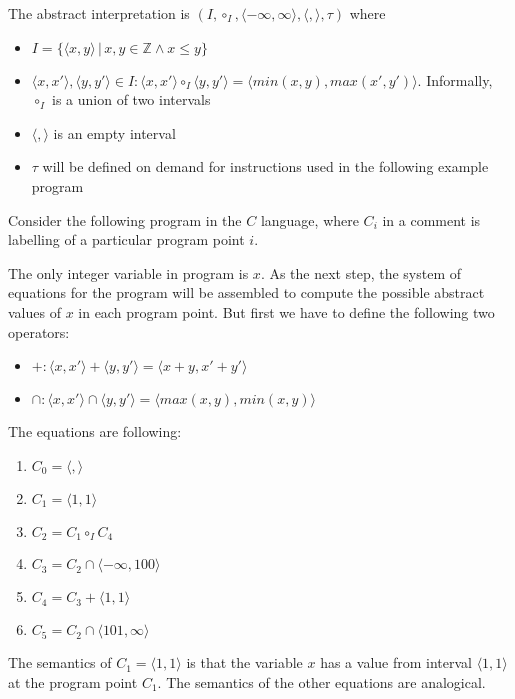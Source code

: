 \documentclass[a4paper, 12pt]{article}
\newcommand{\interval}[2]{\langle #1,#2 \rangle}
\newcommand{\atrans}[0]{\tau}
\newcommand{\ajoin}[0]{\circ}
\newcommand{\intg}[0]{\mathbb{Z}}
\newcommand{\iintg}[0]{I}
\newcommand{\ijoin}[0]{\ajoin_\iintg}
\begin{document}
The abstract interpretation is $(\iintg, \ijoin, \interval{-\infty}{\infty}, \interval{}{}, \atrans)$ where 
\begin{itemize}
	\item $\iintg = \{\interval{x}{y} \,|\, x,y \in \intg \wedge x \leq y\}$
	\item $\interval{x}{x'}, \interval{y}{y'} \in \iintg: \interval{x}{x'} \ijoin \interval{y}{y'}
		= \interval{min(x,y)}{max(x',y')}$. Informally, $\ijoin$ is a union of two intervals
	\item $\interval{}{}$ is an empty interval
	\item $\atrans$ will be defined on demand for instructions used in the following example program
\end{itemize}

Consider the following program in the $C$ language, where $C_i$ in a comment is labelling
of a particular program point $i$.



The only integer variable in program is $x$. As the next step,
the system of equations for the program will be assembled
to compute the possible abstract values of $x$ in each program point.
But first we have to define the following two operators:
\begin{itemize}
	\item $+: \interval{x}{x'} + \interval{y}{y'} = \interval{x+y}{x'+y'}$
	\item $\cap: \interval{x}{x'} \cap \interval{y}{y'} = \interval{max(x,y)}{min(x,y)}$
\end{itemize}

The equations are following:
\begin{enumerate}
	\item $C_0 = \interval{}{}$
	\item $C_1 = \interval{1}{1}$
	\item $C_2 = C_1 \ijoin C_4$
	\item $C_3 = C_2 \cap \interval{-\infty}{100}$
	\item $C_4 = C_3 + \interval{1}{1}$
	\item $C_5 = C_2 \cap \interval{101}{\infty}$
\end{enumerate}

The semantics of $C_1 = \interval{1}{1}$ is that the variable $x$ has a value from interval $\interval{1}{1}$
at the program point $C_1$. The semantics of the other equations are analogical.
\end{document}
